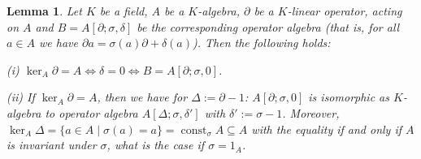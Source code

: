 \documentclass[a4paper,10pt]{article}
\newtheorem{Lemma}[Th]{Lemma}
\theoremstyle{nonumberplain}
\newtheorem{proof}{Proof}
\renewcommand{\d}{\partial}
\DeclareMathOperator{\const}{const}
\begin{document}
\begin{Lemma}
\label{CorDelta}
Let $K$ be a field, $A$ be a $K$-algebra, $\partial$ be a $K$-linear operator, acting on $A$ and $B = A[\partial; \sigma, \delta]$ be the corresponding operator algebra (that is, for all $a \in A$ we have $ \partial a = \sigma(a) \partial + \delta(a)$). Then the following holds:

(i) $\ker_A \partial = A \Leftrightarrow \delta = 0 \Leftrightarrow B = A[\partial; \sigma, 0]$.

(ii) If $\ker_A \partial = A$, then we have for $\Delta := \partial - 1$:
$A[\partial; \sigma, 0]$ is isomorphic as $K$-algebra to operator algebra $A[\Delta; \sigma, \delta']$ with $\delta' := \sigma - 1$. Moreover, 
$\ker_A \Delta = \{a\in A\mid \sigma(a) = a\} = \const_{\sigma} A \subseteq A$ with the
equality if and only if $A$ is invariant under $\sigma$, what is the case if $\sigma = 1_A$.
\end{Lemma}


\end{document}
